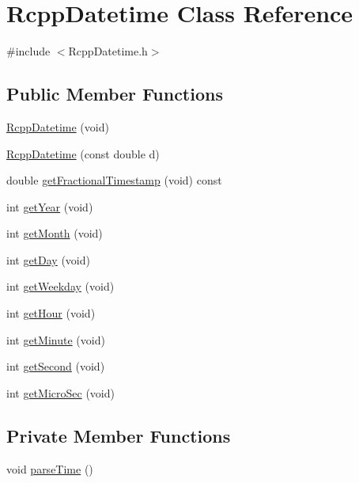\hypertarget{classRcppDatetime}{
\section{RcppDatetime Class Reference}
\label{classRcppDatetime}
}


{\ttfamily \#include $<$RcppDatetime.h$>$}\subsection*{Public Member Functions}
\begin{DoxyCompactItemize}
\item 
\hyperlink{classRcppDatetime_a5a1679444e775781bf038553ef3b04ae}{RcppDatetime} (void)
\item 
\hyperlink{classRcppDatetime_a43972d46cd15e6cb666d61f13bdc31f2}{RcppDatetime} (const double d)
\item 
double \hyperlink{classRcppDatetime_acb74d27387c0d851414e20d30354ac62}{getFractionalTimestamp} (void) const 
\item 
int \hyperlink{classRcppDatetime_aba930a8d7d575eb10444258a442027cf}{getYear} (void)
\item 
int \hyperlink{classRcppDatetime_aa7f04947d2a27e4bba2d19efa21771ed}{getMonth} (void)
\item 
int \hyperlink{classRcppDatetime_a23e9f09bef162e1ffef0e43f8a446b77}{getDay} (void)
\item 
int \hyperlink{classRcppDatetime_a796802561fa8bb87a8e2a1836afaaa58}{getWeekday} (void)
\item 
int \hyperlink{classRcppDatetime_a0da8db1ecd235a6e7ab309e70e4e93b0}{getHour} (void)
\item 
int \hyperlink{classRcppDatetime_adb41bd524ead66d69e129b1f2767358a}{getMinute} (void)
\item 
int \hyperlink{classRcppDatetime_a2feb900005890d183cc5f6a626c4d614}{getSecond} (void)
\item 
int \hyperlink{classRcppDatetime_acdf9e19f28c84fde38c352df5f225999}{getMicroSec} (void)
\end{DoxyCompactItemize}
\subsection*{Private Member Functions}
\begin{DoxyCompactItemize}
\item 
void \hyperlink{classRcppDatetime_aa4b2eba45c4c02b5d334dd89e080b660}{parseTime} ()
\end{DoxyCompactItemize}
